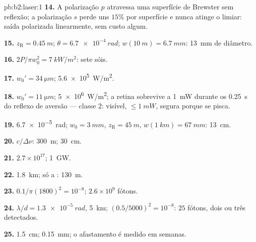 \begin{solution}{pb:b2:laser:1}
\textbf{14.} A polarização $p$ atravessa uma superfície de Brewster sem
reflexão; a polarização $s$ perde uns $15\%$ por superfície e
nunca atinge o limiar: saída polarizada linearmente, sem custo algum.

\textbf{15.} $z_{\text{R}} = \qty{0.45}{m}$; $\theta = \qty{6.7e-4}{rad}$; $w(\qty{10}{m})
= \qty{6.7}{mm}$: \qty{13}{mm} de diâmetro.

\textbf{16.} $2P/\pi w_0^2 = \qty{7}{kW/m^2}$: sete sóis.

\textbf{17.} $w_0' = \qty{34}{\micro m}$; \qty{5.6e5}{W/m^2}.

\textbf{18.} $w_0' = \qty{11}{\micro m}$; \qty{5e6}{W/m^2}; a retina sobrevive a
\qty{1}{mW} durante os \qty{0.25}{s} do reflexo de aversão --- classe 2: visível,
$\le \qty{1}{mW}$, segura porque se pisca.

\textbf{19.} \qty{6.7e-5}{rad}; $w_0 = \qty{3}{mm}$, $z_{\text{R}} = \qty{45}{m}$,
$w(\qty{1}{km}) = \qty{67}{mm}$: \qty{13}{cm}.

\textbf{20.} $c/\Delta\nu$: \qty{300}{m}; \qty{30}{cm}.

\textbf{21.} $2.7 \times 10^{17}$; \qty{1}{GW}.

\textbf{22.} \qty{1.8}{km}; só a : \qty{130}{m}.

\textbf{23.} $0.1/\pi(1800)^2 = 10^{-8}$; $2.6 \times 10^9$ fótons.

\textbf{24.} $\lambda/d = \qty{1.3e-5}{rad}$, \qty{5}{km}; $(0.5/5000)^2 = 10^{-8}$:
$25$ fótons, dois ou três detectados.

\textbf{25.} \qty{1.5}{cm}; \qty{0.15}{mm}; o afastamento é medido em
semanas.
\end{solution}

